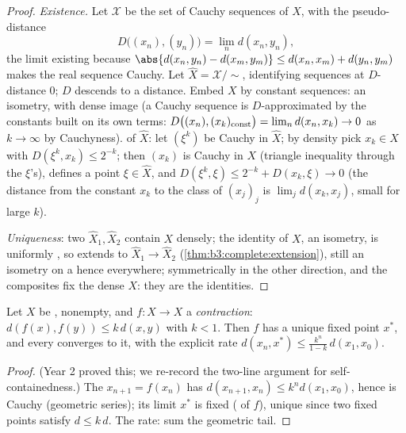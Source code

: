 \begin{proof}
\emph{Existence.} Let $\mathcal X$ be the set of Cauchy
sequences of $X$, with the pseudo-distance
\[
D\bigl((x_n), (y_n)\bigr) = \lim_n d(x_n, y_n),
\]
the limit existing because $\abs{d(x_n, y_n) - d(x_m, y_m)}
\leq d(x_n, x_m) + d(y_n, y_m)$ makes the real sequence
Cauchy. Let $\hat X = \mathcal X/{\sim}$,
identifying sequences at $D$-distance $0$; $D$ descends to a
distance. Embed $X$ by constant sequences: an isometry, with
dense image (a Cauchy sequence is $D$-approximated by the
constants built on its own terms: $D\bigl((x_n), (x_k)_{\rm
const}\bigr) = \lim_n d(x_n, x_k) \to 0$ as $k \to \infty$ by
Cauchyness).  of $\hat X$: let $(\xi^k)$ be Cauchy
in $\hat X$; by density pick $x_k \in X$ with $D(\xi^k, x_k)
\leq 2^{-k}$; then $(x_k)$ is Cauchy in $X$ (triangle
inequality through the $\xi$'s), defines a point $\xi \in \hat
X$, and $D(\xi^k, \xi) \leq 2^{-k} + D(x_k, \xi) \to 0$ (the
distance from the constant $x_k$ to the class of $(x_j)_j$ is
$\lim_j d(x_k, x_j)$, small for large $k$).

\emph{Uniqueness}: two  $\hat X_1, \hat X_2$ contain
$X$ densely; the identity of $X$, an isometry, is uniformly
, so extends to $\hat X_1 \to \hat X_2$
(\cref{thm:b3:complete:extension}), still an isometry on a  hence everywhere; symmetrically in the other direction, and
the composites fix the dense $X$: they are the identities.
\end{proof}

\begin{theorem}\label{thm:b3:complete:banach}
Let $X$ be , nonempty, and $f \colon X \to X$ a
\emph{contraction}: $d(f(x), f(y)) \leq k\,d(x,y)$ with $k < 1$.
Then $f$ has a unique fixed point $x^*$, and every 
converges to it, with the explicit rate $d(x_n, x^*) \leq
\frac{k^n}{1-k}\,d(x_1, x_0)$.
\end{theorem}

\begin{proof}
(Year 2 proved this; we re-record the two-line argument for
self-containedness.) The  $x_{n+1} = f(x_n)$ has $d(x_{n+1},
x_n) \leq k^nd(x_1, x_0)$, hence is Cauchy (geometric series);
its limit $x^*$ is fixed ( of $f$), unique since two
fixed points satisfy $d \leq k\,d$. The rate: sum the geometric
tail.
\end{proof}

